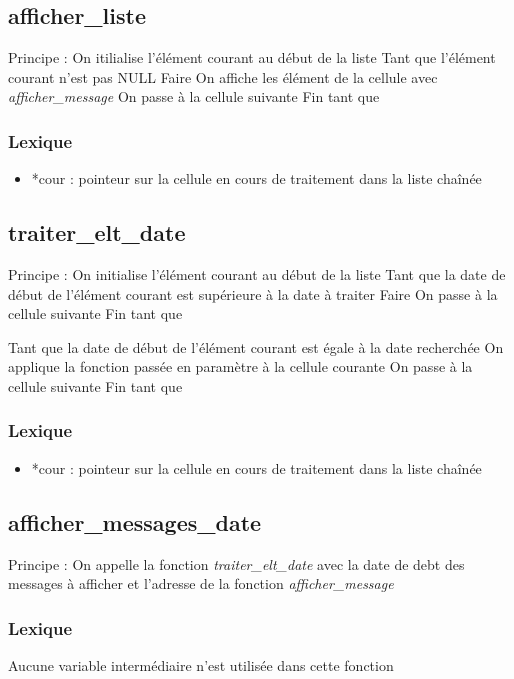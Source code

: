 \documentclass{report}
\begin{document}
      \subsection{afficher\_liste}
Principe :
On itilialise l'élément courant au début de la liste
Tant que l'élément courant n'est pas NULL Faire
  On affiche les élément de la cellule avec \textit{afficher\_message}
  On passe à la cellule suivante
Fin tant que

        \subsubsection{Lexique}
        \begin{itemize}
          \item *cour : pointeur sur la cellule en cours de traitement dans la liste chaînée
        \end{itemize}
      
        \subsection{traiter\_elt\_date}
Principe :
On initialise l'élément courant au début de la liste
Tant que la date de début de l'élément courant est supérieure à la date à traiter Faire
  On passe à la cellule suivante
Fin tant que

Tant que la date de début de l'élément courant est égale à la date recherchée
  On applique la fonction passée en paramètre à la cellule courante
  On passe à la cellule suivante
Fin tant que

        \subsubsection{Lexique}
        \begin{itemize}
          \item *cour : pointeur sur la cellule en cours de traitement dans la liste chaînée
        \end{itemize}

      \subsection{afficher\_messages\_date}
Principe :
On appelle la fonction \textit{traiter\_elt\_date} avec la date de debt des messages à afficher et l'adresse de la fonction \textit{afficher\_message}

        \subsubsection{Lexique}
          Aucune variable intermédiaire n'est utilisée dans cette fonction
\end{document}
